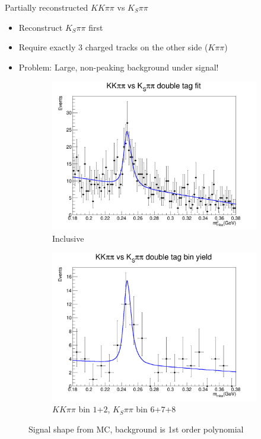 \documentclass{beamer}
\begin{document}
\begin{frame}{Partially reconstructed $KK\pi\pi$ vs $K_S\pi\pi$}
  \begin{itemize}
    \setlength\itemsep{1.0em}
    \item{Reconstruct $K_S\pi\pi$ first}
    \item{Require exactly 3 charged tracks on the other side ($K\pi\pi$)}
    \item{Problem: Large, non-peaking background under signal!}
  \end{itemize}
  \begin{figure}
    \centering
    \begin{subfigure}{0.49\textwidth}
      \centering
      \includegraphics[width=\textwidth]{Plots/KSpipiPartRecoNoPi0Veto_Inclusive_DoubleTagYield.png}
      \caption{Inclusive}
    \end{subfigure}%
    \begin{subfigure}{0.49\textwidth}
      \centering
      \includegraphics[width=\textwidth]{Plots/KSpipiPartRecoNoPi0Veto_1_DoubleTagYield.png}
      \caption{$KK\pi\pi$ bin $1$+$2$, $K_S\pi\pi$ bin $6$+$7$+$8$}
    \end{subfigure}
    \caption{Signal shape from MC, background is 1st order polynomial}
  \end{figure}
\end{frame}
\end{document}

